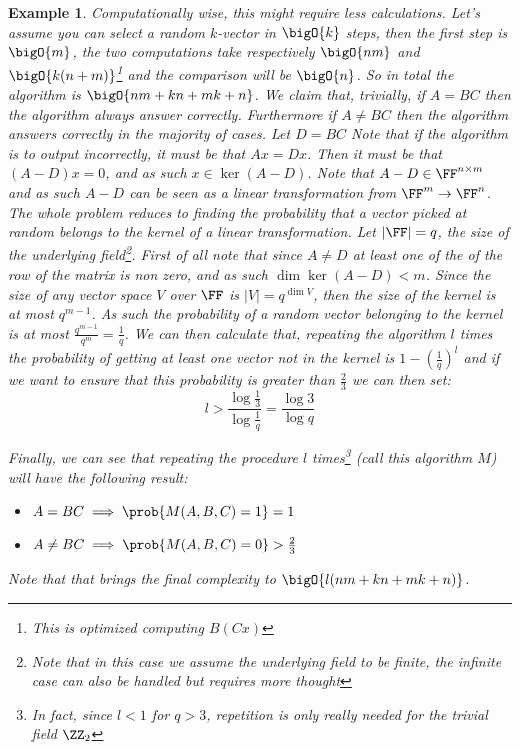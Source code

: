 \documentclass{article}
\newtheorem{example}{Example}
\begin{document}
\begin{example}
    Computationally wise, this might require less calculations. Let's assume you can select a random $k$-vector in $\bigO{k}$ steps, then the first step is $\bigO{m}$, the two computations take respectively $\bigO{nm}$ and $\bigO{k (n + m)}$\footnote{This is optimized computing $B(Cx)$} and the comparison will be $\bigO{n}$. So in total the algorithm is $\bigO{nm + kn + mk + n}$. We claim that, trivially, if $A = BC$ then the algorithm always answer correctly. Furthermore if $A \neq BC$ then the algorithm answers correctly in the majority of cases. Let $D = BC$ Note that if the algorithm is to output incorrectly, it must be that $Ax = Dx$. Then it must be that $(A - D) x = 0$, and as such $x \in \ker(A - D)$. Note that $A - D \in \FF^{n \times m}$ and as such $A - D$ can be seen as a linear transformation from $\FF^m \to \FF^n$. The whole problem reduces to finding the probability that a vector picked at random belongs to the kernel of a linear transformation. Let $|\FF| = q$, the size of the underlying field\footnote{Note that in this case we assume the underlying field to be finite, the infinite case can also be handled but requires more thought}. First of all note that since $A \neq D$ at least one of the of the row of the matrix is non zero, and as such $\dim \ker (A - D) < m$. Since the size of any vector space $V$ over $\FF$ is $|V| = q^{\dim V}$, then the size of the kernel is at most $q^{m - 1}$. As such the probability of a random vector belonging to the kernel is at most $\frac{q^{m-1}}{q^m}=\frac{1}{q}$. We can then calculate that, repeating the algorithm $l$ times the probability of getting at least one vector not in the kernel is $1 - \left(\frac{1}{q}\right)^l$ and if we want to ensure that this probability is greater than $\frac{2}{3}$ we can then set:
    \[l > \frac{\log \frac{1}{3}}{\log \frac{1}{q}} = \frac{\log{3}}{\log{q}}\]

    Finally, we can see that repeating the procedure $l$ times\footnote{In fact, since $l < 1$ for $q > 3$, repetition is only really needed for the trivial field $\ZZ_2$} (call this algorithm $M$) will have the following result:
    \begin{itemize}
        \item $A = BC \implies \prob{M(A, B,C) = 1} = 1$
        \item $A \neq BC \implies \prob{M(A, B,C) = 0} > \frac{2}{3}$
    \end{itemize}

    Note that that brings the final complexity to $\bigO{l(nm + kn + mk + n)}$.

\end{example}
\end{document}
